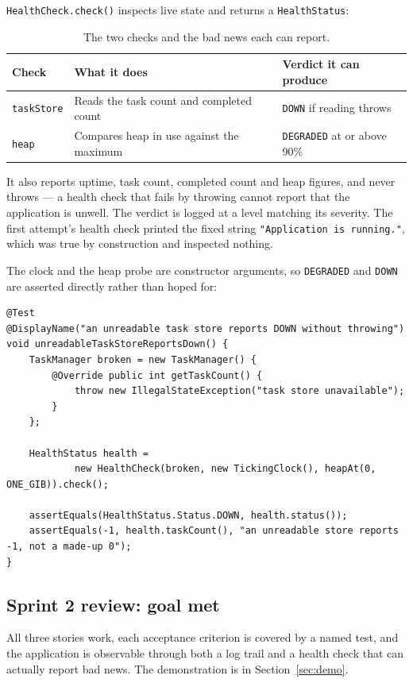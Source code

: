\documentclass[11pt,a4paper]{article}
\newcommand{\code}[1]{\texttt{\small #1}}
\begin{document}
\code{HealthCheck.check()} inspects live state and returns a
\code{HealthStatus}:

\begin{table}[h]
\centering
\small
\begin{tabularx}{\textwidth}{@{}l X l@{}}
\toprule
\textbf{Check} & \textbf{What it does} & \textbf{Verdict it can produce} \\
\midrule
\code{taskStore} & Reads the task count and completed count & \code{DOWN} if reading throws \\
\code{heap} & Compares heap in use against the maximum & \code{DEGRADED} at or above 90\% \\
\bottomrule
\end{tabularx}
\caption{The two checks and the bad news each can report.}
\end{table}

It also reports uptime, task count, completed count and heap figures, and never
throws --- a health check that fails by throwing cannot report that the
application is unwell. The verdict is logged at a level matching its severity.
The first attempt's health check printed the fixed string
\code{"Application is running."}, which was true by construction and inspected
nothing.

The clock and the heap probe are constructor arguments, so \code{DEGRADED} and
\code{DOWN} are asserted directly rather than hoped for:

\begin{lstlisting}[style=java]
@Test
@DisplayName("an unreadable task store reports DOWN without throwing")
void unreadableTaskStoreReportsDown() {
    TaskManager broken = new TaskManager() {
        @Override public int getTaskCount() {
            throw new IllegalStateException("task store unavailable");
        }
    };

    HealthStatus health =
            new HealthCheck(broken, new TickingClock(), heapAt(0, ONE_GIB)).check();

    assertEquals(HealthStatus.Status.DOWN, health.status());
    assertEquals(-1, health.taskCount(), "an unreadable store reports -1, not a made-up 0");
}
\end{lstlisting}

\subsection{Sprint 2 review: goal met}

All three stories work, each acceptance criterion is covered by a named test,
and the application is observable through both a log trail and a health check
that can actually report bad news. The demonstration is in
Section~\ref{sec:demo}.
\end{document}
